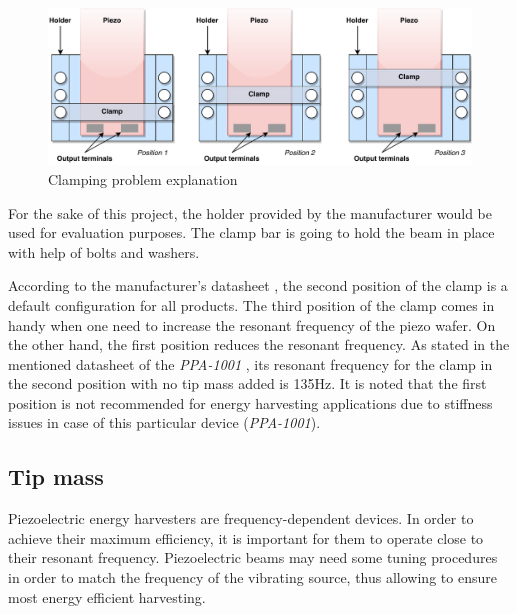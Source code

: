 \documentclass[12pt,a4paper]{article}
\begin{document}
\begin{figure}[ht!]
\includegraphics[scale=0.85]{clamping.pdf}
\caption{Clamping problem explanation}
\label{fig:clamping}
\end{figure}

For the sake of this project, the holder provided by the manufacturer would be used for evaluation purposes. The clamp bar is going to hold the beam in place with help of bolts and washers.\par
According to the manufacturer's datasheet \cite{PPA}, the second position of the clamp is a default configuration for all products. The third position of the clamp comes in handy when one need to increase the resonant frequency of the piezo wafer. On the other hand, the first position reduces the resonant frequency. As stated in the mentioned datasheet of the \textit{PPA-1001} \cite{PPA}, its resonant frequency for the clamp in the second position with no tip mass added is 135Hz. It is noted that the first position is not recommended for energy harvesting applications due to stiffness issues in case of this particular device (\textit{PPA-1001}).\par

\subsection{Tip mass}
Piezoelectric energy harvesters are frequency-dependent devices. In order to achieve their maximum efficiency, it is important for them to operate close to their resonant frequency. Piezoelectric beams may need some tuning procedures in order to match the frequency of the vibrating source, thus allowing to ensure most energy efficient harvesting.\par
\end{document}
